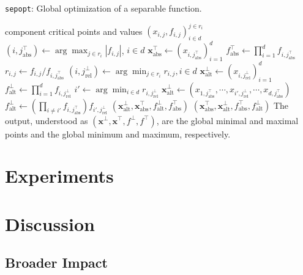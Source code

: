 \documentclass{article}
\begin{document}
\begin{algorithm}[h]
  \caption{\texttt{sepopt}: Global optimization of a separable function.}
  \label{alg:sepopt}
  \begin{algorithmic}[1] %
    \Input component critical points and values $(x_{i,j}, f_{i,j})_{i \in d}^{j \in r_i}$
    \State $(i, j^\top_{\mathrm{abs}}) \gets \arg\max_{j \in r_i} |f_{i,j}|$, $i \in d$
    \State $\mathbf{x}_{\mathrm{abs}}^\top \gets (x_{i, j^\top_{\mathrm{abs}}})_{i=1}^d$
    \State $f_{\mathrm{abs}}^\top \gets \prod_{i=1}^d f_{i, j^\top_{\mathrm{abs}}}$
    \State $r_{i,j} \gets f_{i,j} / f_{i, j^\top_{\mathrm{abs}}}$
    \State $(i, j^\bot_{\mathrm{rel}}) \gets \arg\min_{j \in r_i} r_{i,j}, i \in d$
    \State $\mathbf{x}_{\mathrm{alt}}^\bot \gets (x_{i, j^\bot_{\mathrm{rel}}})_{i=1}^d$
    \State $f_{\mathrm{alt}}^\bot \gets \prod_{i=1}^d f_{i, j^\bot_{\mathrm{rel}}}$
    \Else
    \State $i' \gets \arg\min_{i \in d} r_{i, j^\bot_{\mathrm{rel}}}$
    \State $\mathbf{x}_{\mathrm{alt}}^\bot \gets (x_{1, j^\top_{\mathrm{abs}}}, \cdots,
    x_{i', j^\bot_{\mathrm{rel}}}, \cdots, x_{d, j^\top_{\mathrm{abs}}})$
    \State $f_{\mathrm{alt}}^\bot \gets (\prod_{i \ne i'} f_{i, j^\top_{\mathrm{abs}}})
    f_{i', j^\bot_{\mathrm{rel}}}$
    \EndIf
    \State \Return $(\mathbf{x}_{\mathrm{alt}}^\bot, \mathbf{x}_{\mathrm{abs}}^\top,
    f_{\mathrm{alt}}^\bot, f_{\mathrm{abs}}^\top)$
    \Else
    \State \Return $(\mathbf{x}_{\mathrm{abs}}^\top, \mathbf{x}_{\mathrm{alt}}^\bot,
    f_{\mathrm{abs}}^\top, f_{\mathrm{alt}}^\bot)$
    \EndIf
    \Note The output, understood as $(\mathbf{x}^\bot, \mathbf{x}^\top, f^\bot, f^\top)$,
  are the global minimal and maximal points and the global minimum and maximum, respectively.
  \end{algorithmic}
\end{algorithm}


\section{Experiments}

\section{Discussion}

\subsection{Broader Impact}
\end{document}
